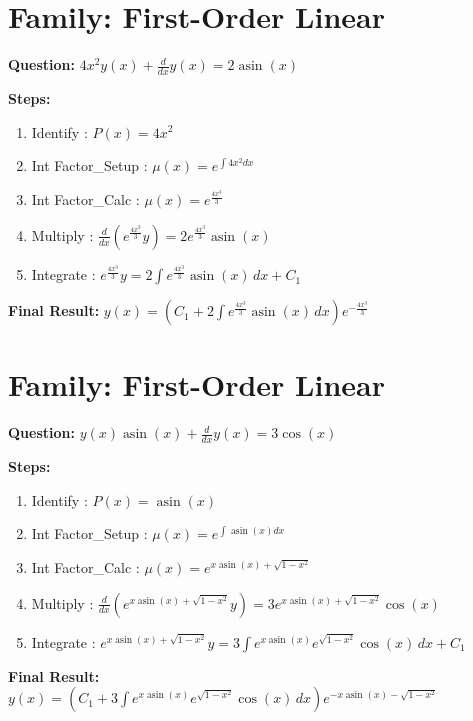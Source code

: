 \documentclass{article}
\begin{document}
\section*{Family: First-Order Linear}
\textbf{Question:} $4 x^{2} y{\left(x \right)} + \frac{d}{d x} y{\left(x \right)} = 2 \operatorname{asin}{\left(x \right)}$

\textbf{Steps:}
\begin{enumerate}
\item Identify :  $P(x) = 4 x^{2}$
\item Int Factor_Setup :  $\mu(x) = e^{\int 4 x^{2} dx}$
\item Int Factor_Calc :  $\mu(x) = e^{\frac{4 x^{3}}{3}}$
\item Multiply :  $\frac{d}{dx}(e^{\frac{4 x^{3}}{3}}y) = 2 e^{\frac{4 x^{3}}{3}} \operatorname{asin}{\left(x \right)}$
\item Integrate :  $e^{\frac{4 x^{3}}{3}}y = 2 \int e^{\frac{4 x^{3}}{3}} \operatorname{asin}{\left(x \right)}\, dx + C_1$
\end{enumerate}
\textbf{Final Result:} $y{\left(x \right)} = \left(C_{1} + 2 \int e^{\frac{4 x^{3}}{3}} \operatorname{asin}{\left(x \right)}\, dx\right) e^{- \frac{4 x^{3}}{3}}$

\section*{Family: First-Order Linear}
\textbf{Question:} $y{\left(x \right)} \operatorname{asin}{\left(x \right)} + \frac{d}{d x} y{\left(x \right)} = 3 \cos{\left(x \right)}$

\textbf{Steps:}
\begin{enumerate}
\item Identify :  $P(x) = \operatorname{asin}{\left(x \right)}$
\item Int Factor_Setup :  $\mu(x) = e^{\int \operatorname{asin}{\left(x \right)} dx}$
\item Int Factor_Calc :  $\mu(x) = e^{x \operatorname{asin}{\left(x \right)} + \sqrt{1 - x^{2}}}$
\item Multiply :  $\frac{d}{dx}(e^{x \operatorname{asin}{\left(x \right)} + \sqrt{1 - x^{2}}}y) = 3 e^{x \operatorname{asin}{\left(x \right)} + \sqrt{1 - x^{2}}} \cos{\left(x \right)}$
\item Integrate :  $e^{x \operatorname{asin}{\left(x \right)} + \sqrt{1 - x^{2}}}y = 3 \int e^{x \operatorname{asin}{\left(x \right)}} e^{\sqrt{1 - x^{2}}} \cos{\left(x \right)}\, dx + C_1$
\end{enumerate}
\textbf{Final Result:} $y{\left(x \right)} = \left(C_{1} + 3 \int e^{x \operatorname{asin}{\left(x \right)}} e^{\sqrt{1 - x^{2}}} \cos{\left(x \right)}\, dx\right) e^{- x \operatorname{asin}{\left(x \right)} - \sqrt{1 - x^{2}}}$
\end{document}
